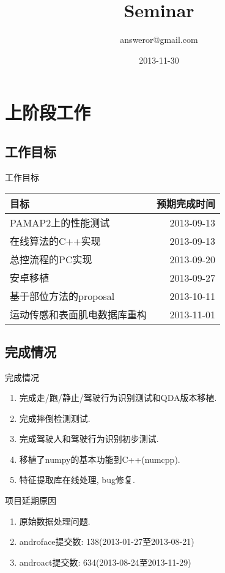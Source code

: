 \documentclass[compress]{beamer}
\title{Seminar}
\author{answeror@gmail.com}
\date{2013-11-30}
\newcommand{\ra}[1]{\renewcommand{\arraystretch}{#1}}
\begin{document}
\frame{\titlepage}

\section{上阶段工作}

\subsection{工作目标}

\begin{frame}{工作目标}
    \begin{center}
        \ra{1.3}
        \begin{tabu} to \textwidth {lR}
            \toprule
            目标 & 预期完成时间 \\
            \midrule
            PAMAP2上的性能测试 & 2013-09-13 \\
            在线算法的C++实现 & 2013-09-13 \\
            总控流程的PC实现 & 2013-09-20 \\
            安卓移植 & 2013-09-27 \\
            基于部位方法的proposal & 2013-10-11 \\
            运动传感和表面肌电数据库重构 & 2013-11-01 \\
            \bottomrule
        \end{tabu}
    \end{center}
\end{frame}

\subsection{完成情况}

\begin{frame}{完成情况}
    \begin{enumerate}[1)]
        \item 完成走/跑/静止/驾驶行为识别测试和QDA版本移植.
        \item 完成摔倒检测测试.
        \item 完成驾驶人和驾驶行为识别初步测试.
        \item 移植了numpy的基本功能到C++(numcpp).
        \item 特征提取库在线处理, bug修复.
    \end{enumerate}
\end{frame}

\begin{frame}{项目延期原因}
    \begin{enumerate}[1)]
        \item 原始数据处理问题.
        \item androface提交数: 138(2013-01-27至2013-08-21)
        \item androact提交数: 634(2013-08-24至2013-11-29)
    \end{enumerate}
\end{frame}
\end{document}
